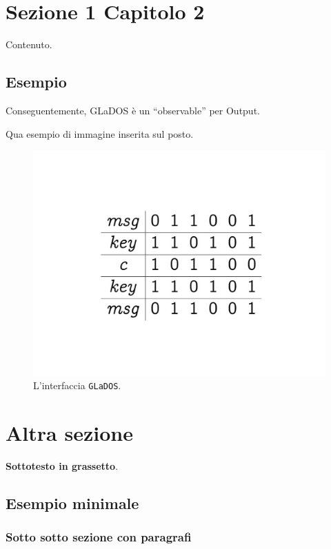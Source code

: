 \documentclass[a4paper,12pt]{report}
\begin{document}
\section{Sezione 1 Capitolo 2}

Contenuto.

\subsection*{Esempio}
Conseguentemente, GLaDOS è un ``observable'' per Output.

Qua esempio di immagine inserita sul posto.

\begin{figure}[h]
\centering{}
\includegraphics[width=\textwidth]{img/example_img.pdf}
\caption{L'interfaccia \texttt{GLaDOS}.}
\label{img:example}
\end{figure}

\section{Altra sezione}

\textbf{Sottotesto in grassetto}.

\subsection*{Esempio minimale}

\subsubsection{Sotto sotto sezione con paragrafi}
\end{document}
